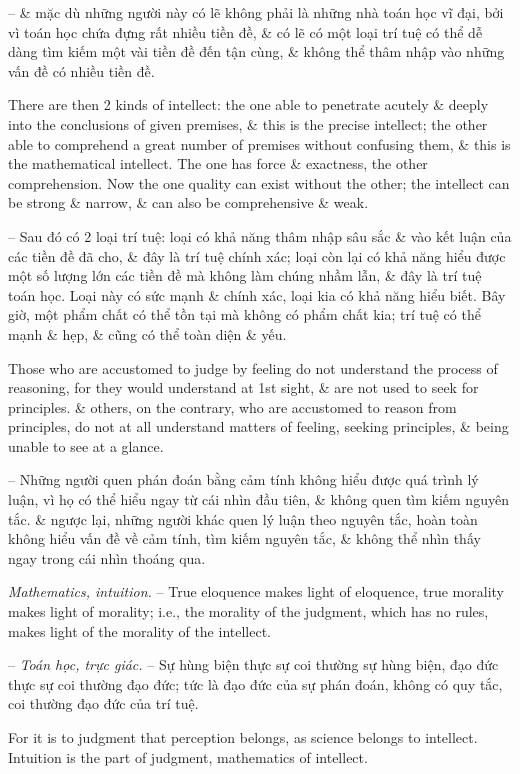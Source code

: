 \documentclass{article}
\begin{document}
\begin{enumerate}
\begin{itemize}
		-- \& mặc dù những người này có lẽ không phải là những nhà toán học vĩ đại, bởi vì toán học chứa đựng rất nhiều tiền đề, \& có lẽ có một loại trí tuệ có thể dễ dàng tìm kiếm một vài tiền đề đến tận cùng, \& không thể thâm nhập vào những vấn đề có nhiều tiền đề.
		
		There are then 2 kinds of intellect: the one able to penetrate acutely \& deeply into the conclusions of given premises, \& this is the precise intellect; the other able to comprehend a great number of premises without confusing them, \& this is the mathematical intellect. The one has force \& exactness, the other comprehension. Now the one quality can exist without the other; the intellect can be strong \& narrow, \& can also be comprehensive \& weak.
		
		-- Sau đó có 2 loại trí tuệ: loại có khả năng thâm nhập sâu sắc \& vào kết luận của các tiền đề đã cho, \& đây là trí tuệ chính xác; loại còn lại có khả năng hiểu được một số lượng lớn các tiền đề mà không làm chúng nhầm lẫn, \& đây là trí tuệ toán học. Loại này có sức mạnh \& chính xác, loại kia có khả năng hiểu biết. Bây giờ, một phẩm chất có thể tồn tại mà không có phẩm chất kia; trí tuệ có thể mạnh \& hẹp, \& cũng có thể toàn diện \& yếu.
		
		 Those who are accustomed to judge by feeling do not understand the process of reasoning, for they would understand at 1st sight, \& are not used to seek for principles. \& others, on the contrary, who are accustomed to reason from principles, do not at all understand matters of feeling, seeking principles, \& being unable to see at a glance.
		
		-- Những người quen phán đoán bằng cảm tính không hiểu được quá trình lý luận, vì họ có thể hiểu ngay từ cái nhìn đầu tiên, \& không quen tìm kiếm nguyên tắc. \& ngược lại, những người khác quen lý luận theo nguyên tắc, hoàn toàn không hiểu vấn đề về cảm tính, tìm kiếm nguyên tắc, \& không thể nhìn thấy ngay trong cái nhìn thoáng qua.
		
		 {\it Mathematics, intuition.} -- True eloquence makes light of eloquence, true morality makes light of morality; i.e., the morality of the judgment, which has no rules, makes light of the morality of the intellect.
		
		-- {\it Toán học, trực giác.} -- Sự hùng biện thực sự coi thường sự hùng biện, đạo đức thực sự coi thường đạo đức; tức là đạo đức của sự phán đoán, không có quy tắc, coi thường đạo đức của trí tuệ.
		
		For it is to judgment that perception belongs, as science belongs to intellect. Intuition is the part of judgment, mathematics of intellect.
		

\end{itemize}
\end{enumerate}
\end{document}
